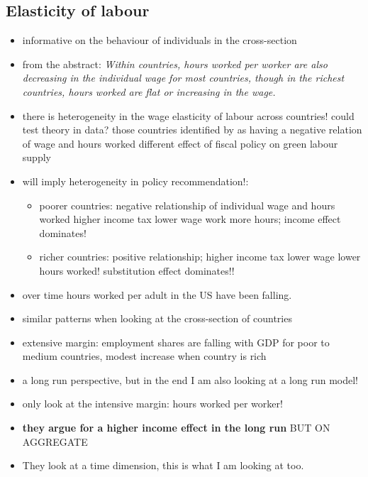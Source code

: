 \subsection{Elasticity of labour}
\cite{Bick2018HowImplications}
\begin{itemize}
	\item \ar informative on the behaviour of individuals in the cross-section
	\item from the abstract: \textit{Within
	countries, hours worked per worker are also decreasing in the individual wage for most countries, though in the richest countries,
	hours worked are flat or increasing in the wage.}
\item there is heterogeneity in the wage elasticity of labour across countries! \ar could test theory in data? \ar those countries identified by \cite{Bick2018HowImplications} as having a negative relation of wage and hours worked \ar different effect of fiscal policy on green labour supply 
\item will imply heterogeneity in policy recommendation!:
\begin{itemize}
	\item poorer countries: negative relationship of individual wage and hours worked \ar higher income tax \ar lower wage \ar work more hours; 
	\ar income effect dominates! 
	\item richer countries:  positive relationship; higher income tax \ar lower wage \ar lower hours worked!
	\ar substitution effect dominates!!
\end{itemize}
\item over time hours worked per adult in the US have been falling. 
\item similar patterns when looking at the cross-section of countries
\item extensive margin: employment shares are falling with GDP for poor to medium countries, modest increase when country is rich
\end{itemize}
\cite{Boppart2019LaborPerspectiveb}
\begin{itemize}
	\item a long run perspective, but in the end I am also looking at a long run model!
	\item only look at the intensive margin: hours worked per worker! 
	\item \textbf{they argue for a higher income effect in the long run} BUT ON AGGREGATE 
	\item They look at a time dimension, this is what I am looking at too.
\end{itemize}
